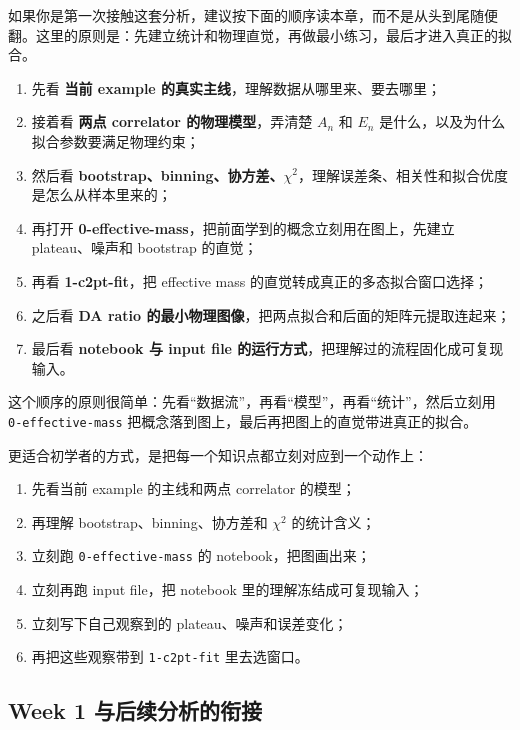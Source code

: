 \documentclass[11pt,a4paper,fontset=fandol]{ctexart}
\begin{document}
如果你是第一次接触这套分析，建议按下面的顺序读本章，而不是从头到尾随便翻。这里的原则是：先建立统计和物理直觉，再做最小练习，最后才进入真正的拟合。

\begin{enumerate}[leftmargin=2em]
  \item 先看 \textbf{当前 example 的真实主线}，理解数据从哪里来、要去哪里；
  \item 接着看 \textbf{两点 correlator 的物理模型}，弄清楚 $A_n$ 和 $E_n$ 是什么，以及为什么拟合参数要满足物理约束；
  \item 然后看 \textbf{bootstrap、binning、协方差、$\chi^2$}，理解误差条、相关性和拟合优度是怎么从样本里来的；
  \item 再打开 \textbf{0-effective-mass}，把前面学到的概念立刻用在图上，先建立 plateau、噪声和 bootstrap 的直觉；
  \item 再看 \textbf{1-c2pt-fit}，把 effective mass 的直觉转成真正的多态拟合窗口选择；
  \item 之后看 \textbf{DA ratio 的最小物理图像}，把两点拟合和后面的矩阵元提取连起来；
  \item 最后看 \textbf{notebook 与 input file 的运行方式}，把理解过的流程固化成可复现输入。
\end{enumerate}

这个顺序的原则很简单：先看“数据流”，再看“模型”，再看“统计”，然后立刻用 \lstinline|0-effective-mass| 把概念落到图上，最后再把图上的直觉带进真正的拟合。

更适合初学者的方式，是把每一个知识点都立刻对应到一个动作上：

\begin{enumerate}[leftmargin=2em]
  \item 先看当前 example 的主线和两点 correlator 的模型；
  \item 再理解 bootstrap、binning、协方差和 $\chi^2$ 的统计含义；
  \item 立刻跑 \lstinline|0-effective-mass| 的 notebook，把图画出来；
  \item 立刻再跑 input file，把 notebook 里的理解冻结成可复现输入；
  \item 立刻写下自己观察到的 plateau、噪声和误差变化；
  \item 再把这些观察带到 \lstinline|1-c2pt-fit| 里去选窗口。
\end{enumerate}

\subsection{Week 1 与后续分析的衔接}
\end{document}

